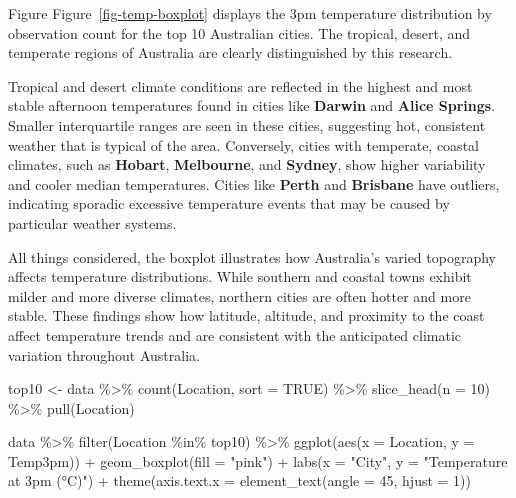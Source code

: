 \documentclass[
  letterpaper,
  DIV=11,
  numbers=noendperiod]{scrartcl}
\newenvironment{Shaded}{\begin{snugshade}}{\end{snugshade}}
\newcommand{\AttributeTok}[1]{\textcolor[rgb]{0.40,0.45,0.13}{#1}}
\newcommand{\ConstantTok}[1]{\textcolor[rgb]{0.56,0.35,0.01}{#1}}
\newcommand{\DecValTok}[1]{\textcolor[rgb]{0.68,0.00,0.00}{#1}}
\newcommand{\FunctionTok}[1]{\textcolor[rgb]{0.28,0.35,0.67}{#1}}
\newcommand{\NormalTok}[1]{\textcolor[rgb]{0.00,0.23,0.31}{#1}}
\newcommand{\OtherTok}[1]{\textcolor[rgb]{0.00,0.23,0.31}{#1}}
\newcommand{\SpecialCharTok}[1]{\textcolor[rgb]{0.37,0.37,0.37}{#1}}
\newcommand{\StringTok}[1]{\textcolor[rgb]{0.13,0.47,0.30}{#1}}
\begin{document}
Figure Figure~\ref{fig-temp-boxplot} displays the 3pm temperature
distribution by observation count for the top 10 Australian cities. The
tropical, desert, and temperate regions of Australia are clearly
distinguished by this research.

Tropical and desert climate conditions are reflected in the highest and
most stable afternoon temperatures found in cities like \textbf{Darwin}
and \textbf{Alice Springs}. Smaller interquartile ranges are seen in
these cities, suggesting hot, consistent weather that is typical of the
area. Conversely, cities with temperate, coastal climates, such as
\textbf{Hobart}, \textbf{Melbourne}, and \textbf{Sydney}, show higher
variability and cooler median temperatures. Cities like \textbf{Perth}
and \textbf{Brisbane} have outliers, indicating sporadic excessive
temperature events that may be caused by particular weather systems.

All things considered, the boxplot illustrates how Australia's varied
topography affects temperature distributions. While southern and coastal
towns exhibit milder and more diverse climates, northern cities are
often hotter and more stable. These findings show how latitude,
altitude, and proximity to the coast affect temperature trends and are
consistent with the anticipated climatic variation throughout Australia.

\begin{Shaded}
\begin{Highlighting}[]
\NormalTok{top10 }\OtherTok{\textless{}{-}}\NormalTok{ data }\SpecialCharTok{\%\textgreater{}\%}
  \FunctionTok{count}\NormalTok{(Location, }\AttributeTok{sort =} \ConstantTok{TRUE}\NormalTok{) }\SpecialCharTok{\%\textgreater{}\%}
  \FunctionTok{slice\_head}\NormalTok{(}\AttributeTok{n =} \DecValTok{10}\NormalTok{) }\SpecialCharTok{\%\textgreater{}\%}
  \FunctionTok{pull}\NormalTok{(Location)}

\NormalTok{data }\SpecialCharTok{\%\textgreater{}\%}
  \FunctionTok{filter}\NormalTok{(Location }\SpecialCharTok{\%in\%}\NormalTok{ top10) }\SpecialCharTok{\%\textgreater{}\%}
  \FunctionTok{ggplot}\NormalTok{(}\FunctionTok{aes}\NormalTok{(}\AttributeTok{x =}\NormalTok{ Location, }\AttributeTok{y =}\NormalTok{ Temp3pm)) }\SpecialCharTok{+}
  \FunctionTok{geom\_boxplot}\NormalTok{(}\AttributeTok{fill =} \StringTok{"pink"}\NormalTok{) }\SpecialCharTok{+}
  \FunctionTok{labs}\NormalTok{(}\AttributeTok{x =} \StringTok{"City"}\NormalTok{, }\AttributeTok{y =} \StringTok{"Temperature at 3pm (°C)"}\NormalTok{) }\SpecialCharTok{+}
  \FunctionTok{theme}\NormalTok{(}\AttributeTok{axis.text.x =} \FunctionTok{element\_text}\NormalTok{(}\AttributeTok{angle =} \DecValTok{45}\NormalTok{, }\AttributeTok{hjust =} \DecValTok{1}\NormalTok{))}
\end{Highlighting}
\end{Shaded}
\end{document}
